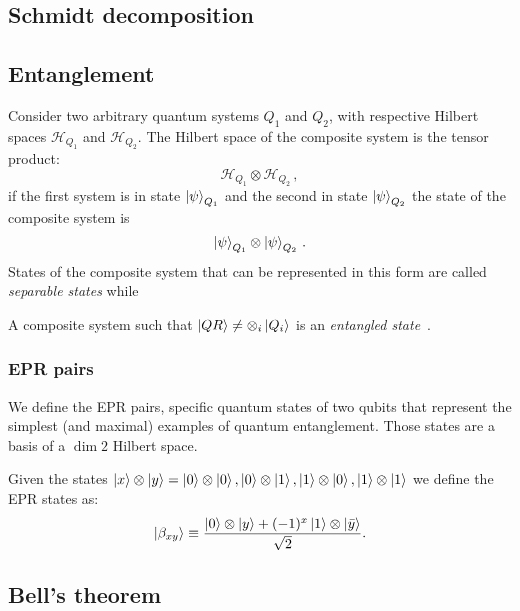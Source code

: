 \subsection{Schmidt decomposition}

\subsection{Entanglement}
Consider two arbitrary quantum systems $Q_1$ and $Q_2$, with respective Hilbert spaces $\mathcal{H}_{Q_1}$ and $\mathcal{H}_{Q_2}.$ The Hilbert space of the composite system is the tensor product: 
\begin{equation*}
\mathcal{H}_{Q_1} \otimes \mathcal{H}_{Q_2}\,,
\end{equation*}
if the first system is in state $\ket{\psi}_{Q_1}$ and the second in state $\ket{\psi}_{Q_2}$ the state of the composite system is
\begin{equation}
    \ket{\psi}_{Q_1} \otimes \ket{\psi}_{Q_2}\,.
\end{equation}
States of the composite system that can be represented in this form are called \emph{separable states} while
\begin{defn}
A composite system such that $\ket{QR} \neq \otimes_i \ket{Q_i}$ is an \emph{entangled state}~\cite{verrucchi}.
\end{defn}

\subsubsection{EPR pairs}
We define the EPR pairs, specific quantum states of two qubits that represent the simplest (and maximal) examples of quantum entanglement. Those states are a basis of a $\dim{2}$ Hilbert space.

Given the states $\ket{x} \otimes \ket{y} = \ket{0} \otimes \ket{0}, \ket{0} \otimes \ket{1}, \ket{1} \otimes \ket{0}, \ket{1} \otimes \ket{1}$ we define the EPR states as:
\begin{equation}
    \ket{\beta_{x y}} \equiv \frac{\ket{0} \otimes \ket{y} +(-1)^{x} \ket{1} \otimes \ket{\bar{y}}}{\sqrt{2}}.
\end{equation}
\subsection{Bell's theorem}

